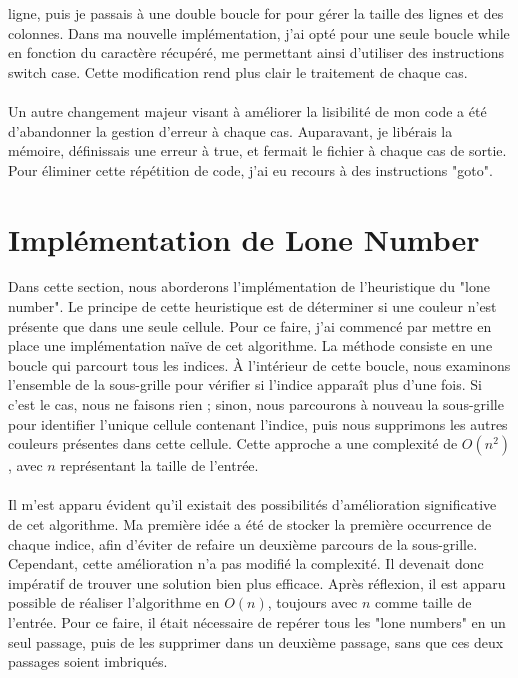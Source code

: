\documentclass{article}
\begin{document}
ligne, puis je passais à une double boucle for pour gérer la taille des lignes
et des colonnes. Dans ma nouvelle implémentation, j'ai opté pour une seule
boucle while en fonction du caractère récupéré, me permettant ainsi d'utiliser
des instructions switch case. Cette modification rend plus clair le traitement
de chaque cas.
\\ \\
Un autre changement majeur visant à améliorer la lisibilité de mon code a été 
d'abandonner la gestion d'erreur à chaque cas. Auparavant, je libérais la 
mémoire, définissais une erreur à true, et fermait le fichier à chaque cas de 
sortie. Pour éliminer cette répétition de code, j'ai eu recours à des 
instructions "goto".


\newpage
\section{Implémentation de Lone Number} 
Dans cette section, nous aborderons l'implémentation de l'heuristique du "lone 
number". Le principe de cette heuristique est de déterminer si une couleur n'est
présente que dans une seule cellule. Pour ce faire, j'ai commencé par mettre en
place une implémentation naïve de cet algorithme. La méthode consiste en une 
boucle qui parcourt tous les indices. À l'intérieur de cette boucle, nous 
examinons l'ensemble de la sous-grille pour vérifier si l'indice apparaît plus 
d'une fois. Si c'est le cas, nous ne faisons rien ; sinon, nous parcourons à 
nouveau la sous-grille pour identifier l'unique cellule contenant l'indice, 
puis nous supprimons les autres couleurs présentes dans cette cellule. Cette 
approche a une complexité de \(O(n^2)\), avec $n$ représentant la taille de 
l'entrée.
\\ \\
Il m'est apparu évident qu'il existait des possibilités d'amélioration 
significative de cet algorithme. Ma première idée a été de stocker la première 
occurrence de chaque indice, afin d'éviter de refaire un deuxième parcours de la
sous-grille. Cependant, cette amélioration n'a pas modifié la complexité. Il 
devenait donc impératif de trouver une solution bien plus efficace. Après 
réflexion, il est apparu possible de réaliser l'algorithme en \(O(n)\), 
toujours avec $n$ comme taille de l'entrée. Pour ce faire, il était nécessaire 
de repérer tous les "lone numbers" en un seul passage, puis de les supprimer 
dans un deuxième passage, sans que ces deux passages soient imbriqués.
\\ \\
\end{document}
